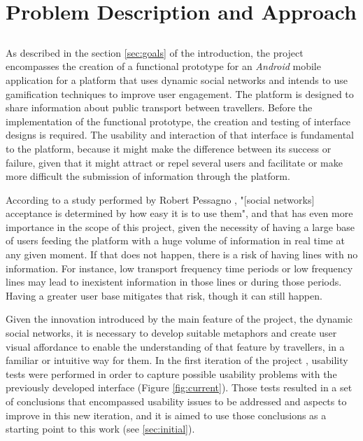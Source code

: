 \chapter{Problem Description and Approach}\label{chap:chap3}

\section*{}

As described in the section \ref{sec:goals} of the introduction, the project encompasses the creation of a functional prototype for an \emph{Android} mobile application for a platform that uses dynamic social networks and intends to use gamification techniques to improve user engagement. The platform is designed to share information about public transport between travellers.
Before the implementation of the functional prototype, the creation and testing of interface designs is required. 
The usability and interaction of that interface is fundamental to the platform, because it might make the difference between its success or failure, given that it might attract or repel several users and facilitate or make more difficult the submission of information through the platform.

According to a study performed by Robert Pessagno \cite{kn:Pes10}, "[social networks] acceptance is determined by how easy it is to use them", and that has even more importance in the scope of this project, given the necessity of having a large base of users feeding the platform with a huge volume of information in real time at any given moment. If that does not happen, there is a risk of having lines with no information. For instance, low transport frequency time periods or low frequency lines may lead to inexistent information in those lines or during those periods. Having a greater user base mitigates that risk, though it can still happen.

Given the innovation introduced by the main feature of the project, the dynamic social networks, it is necessary to develop suitable metaphors and create user visual affordance to enable the understanding of that feature by travellers, in a familiar or intuitive way for them.
In the first iteration of the project \cite{kn:eSG12}, usability tests were performed in order to capture possible usability problems with the previously developed interface (Figure \ref{fig:current}). 
Those tests resulted in a set of conclusions that encompassed  usability issues to be addressed and aspects to improve in this new iteration, and it is aimed to use those conclusions as a starting point to this work (see \ref{sec:initial}). 

